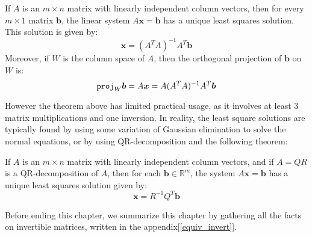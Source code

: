 \documentclass{report}
\begin{document}
			\begin{thm}
				If $A$ is an $m \times n$ matrix with linearly independent column vectors, then for every $m \times 1$ matrix $\bm{b}$, the linear system $A\bm{x}=\bm{b}$ has a unique least squares solution. This solution is given by:
				\begin{displaymath}
					\bm{x}=(A^TA)^{-1}A^T\bm{b}
				\end{displaymath}
				Moreover, if $W$ is the column space of $A$, then the orthogonal projection of $\bm{b}$ on $W$ is:
				\begin{displaymath}
					\verb|proj|_W\bm{b}=A\bm{x}=A(A^TA)^{-1}A^T\bm{b}
				\end{displaymath}
			\end{thm}
			
			However the theorem above has limited practical usage, as it involves at least 3 matrix multiplications and one inversion. In reality, the least square solutions are typically found by using some variation of Gaussian elimination to solve the normal equations, or by using QR-decomposition and the following theorem:
			
			\begin{thm}
				If $A$ is an $m \times n$ matrix with linearly independent column vectors, and if $A=QR$ is a QR-decomposition of $A$, then for each $\bm{b} \in \mathbb{R}^m$, the system $A\bm{x}=\bm{b}$ has a unique least squares solution given by:
				\begin{displaymath}
					\bm{x}=R^{-1}Q^T\bm{b}
				\end{displaymath}
			\end{thm}
			
	Before ending this chapter, we summarize this chapter by gathering all the facts on invertible matrices, written in the appendix[\ref{equiv_invert}].
\end{document}
